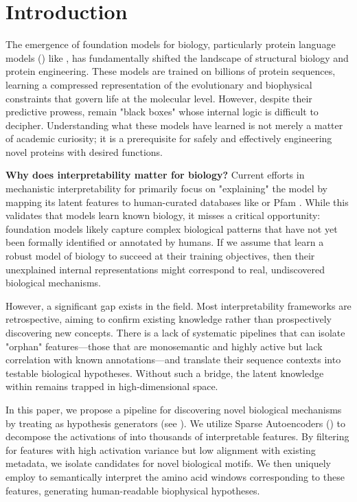 \section{Introduction}
\label{sec:intro}

The emergence of foundation models for biology, particularly protein language models (\plms) like \esm \cite{lin2022esm2}, has fundamentally shifted the landscape of structural biology and protein engineering. These models are trained on billions of protein sequences, learning a compressed representation of the evolutionary and biophysical constraints that govern life at the molecular level. However, despite their predictive prowess, \plms remain "black boxes" whose internal logic is difficult to decipher. Understanding what these models have learned is not merely a matter of academic curiosity; it is a prerequisite for safely and effectively engineering novel proteins with desired functions.

{\bf Why does interpretability matter for biology?} Current efforts in mechanistic interpretability for \plms primarily focus on "explaining" the model by mapping its latent features to human-curated databases like \uniprot or Pfam \cite{simon2024interplm, adams2025mechanistic}. While this validates that models learn known biology, it misses a critical opportunity: foundation models likely capture complex biological patterns that have not yet been formally identified or annotated by humans. If we assume that \plms learn a robust model of biology to succeed at their training objectives, then their unexplained internal representations might correspond to real, undiscovered biological mechanisms.

However, a significant gap exists in the field. Most interpretability frameworks are retrospective, aiming to confirm existing knowledge rather than prospectively discovering new concepts. There is a lack of systematic pipelines that can isolate "orphan" features—those that are monosemantic and highly active but lack correlation with known annotations—and translate their sequence contexts into testable biological hypotheses. Without such a bridge, the latent knowledge within \plms remains trapped in high-dimensional space.

In this paper, we propose a pipeline for discovering novel biological mechanisms by treating \plms as hypothesis generators (see ). We utilize Sparse Autoencoders (\saes) to decompose the activations of \esm into thousands of interpretable features. By filtering for features with high activation variance but low alignment with existing \swissprot metadata, we isolate candidates for novel biological motifs. We then uniquely employ \gpt to semantically interpret the amino acid windows corresponding to these features, generating human-readable biophysical hypotheses.

